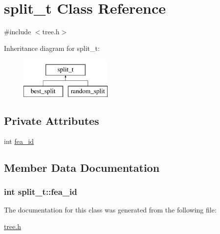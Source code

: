 \hypertarget{classsplit__t}{\section{split\+\_\+t Class Reference}
\label{classsplit__t}
}


{\ttfamily \#include $<$tree.\+h$>$}

Inheritance diagram for split\+\_\+t\+:\begin{figure}[H]
\begin{center}
\leavevmode
\includegraphics[height=2.000000cm]{classsplit__t}
\end{center}
\end{figure}
\subsection*{Private Attributes}
\begin{DoxyCompactItemize}
\item 
int \hyperlink{classsplit__t_aea4bc92869598a4f8030a1195369fddc}{fea\+\_\+id}
\end{DoxyCompactItemize}


\subsection{Member Data Documentation}
\hypertarget{classsplit__t_aea4bc92869598a4f8030a1195369fddc}{
\subsubsection[{fea\+\_\+id}]{\setlength{\rightskip}{0pt plus 5cm}int split\+\_\+t\+::fea\+\_\+id\hspace{0.3cm}{\ttfamily [private]}}}\label{classsplit__t_aea4bc92869598a4f8030a1195369fddc}


The documentation for this class was generated from the following file\+:\begin{DoxyCompactItemize}
\item 
\hyperlink{tree_8h}{tree.\+h}\end{DoxyCompactItemize}
